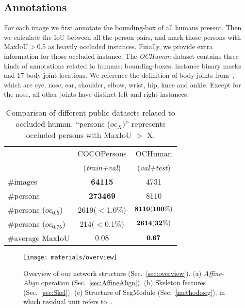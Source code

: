 \documentclass[10pt,twocolumn,letterpaper]{article}
\begin{document}
\subsection{Annotations}
For each image we first annotate the bounding-box of all humans present. Then we calculate the IoU between all the person pairs, and mark those persons with MaxIoU$>$0.5 as heavily occluded instances. Finally, we provide extra information for those occluded instance. The \emph{OCHuman} dataset contains three kinds of annotations related to humans: bounding-boxes, instance binary masks and 17 body joint locations. We reference the definition of body joints from~\cite{lin2014microsoft}, which are eye, nose, ear, shoulder, elbow, wrist, hip, knee and ankle. Except for the nose, all other joints have distinct left and right instances. 

\setlength{\tabcolsep}{10pt}
\begin{table}[t]
\small
\begin{center}
\begin{tabular}{lcc}
\toprule[1.5pt]
 & COCOPersons & OCHuman \\
 & (\emph{train+val}) & (\emph{val+test}) \\
\hline
\#images   & \bf{64115} & 4731  \\
\#persons  & \bf{273469}  & 8110  \\
\#persons ($oc_{0.5}$)    & 2619($<$1.0\%)  & $\bf{8110(100\%)}$  \\
\#persons ($oc_{0.75}$)  & 214($<$0.1\%)  & $\bf{2614(32\%)}$  \\
\#average MaxIoU 			   & $0.08$  & $\bf{0.67}$  \\
\bottomrule[1.5pt]
\end{tabular}
\end{center}
\setlength{\abovecaptionskip}{-0.1cm}
\setlength{\belowcaptionskip}{-0.5cm}
\caption{Comparison of different public datasets related to occluded human. ``persons ($oc_{X}$)'' represents occluded persons with MaxIoU $>$ X.}
\label{table:dataset_statistics}
\end{table}



\begin{figure*}[t]
\centering
\setlength{\abovecaptionskip}{0.1cm}
\setlength{\belowcaptionskip}{-0.5cm}
\texttt{[image: materials/overview]} 
\caption{Overview of our network structure (Sec.~\ref{sec:overview}). (a) \emph{Affine-Align} operation (Sec.~\ref{sec:AffineAlign}). (b) Skeleton features (Sec.~\ref{sec:Skel}). (c) Structure of SegModule (Sec.~\ref{method:seg}), in which residual unit refers to~\cite{he2016deep}.}
\label{fig:structure}
\end{figure*}
\end{document}
